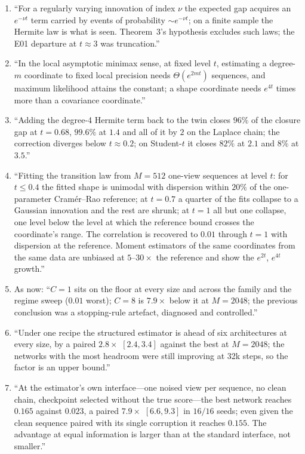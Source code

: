 \begin{enumerate}
\item {} ``For a regularly varying innovation of index $\nu$ the expected gap acquires an $e^{-\nu t}$ term carried by events of probability $\sim e^{-\nu t}$; on a finite sample the Hermite law is what is seen. Theorem~3's hypothesis excludes such laws; the E01 departure at $t\approx3$ was truncation.''
\item {} ``In the local asymptotic minimax sense, at fixed level $t$, estimating a degree-$m$ coordinate to fixed local precision needs $\Theta(e^{2mt})$ sequences, and maximum likelihood attains the constant; a shape coordinate needs $e^{4t}$ times more than a covariance coordinate.''
\item {} ``Adding the degree-4 Hermite term back to the twin closes $96\%$ of the closure gap at $t=0.68$, $99.6\%$ at $1.4$ and all of it by $2$ on the Laplace chain; the correction diverges below $t\approx0.2$; on Student-$t$ it closes $82\%$ at $2.1$ and $8\%$ at $3.5$.''
\item {} ``Fitting the transition law from $M=512$ one-view sequences at level $t$: for $t\le0.4$ the fitted shape is unimodal with dispersion within $20\%$ of the one-parameter Cram\'er--Rao reference; at $t=0.7$ a quarter of the fits collapse to a Gaussian innovation and the rest are shrunk; at $t=1$ all but one collapse, one level below the level at which the reference bound crosses the coordinate's range. The correlation is recovered to $0.01$ through $t=1$ with dispersion at the reference. Moment estimators of the same coordinates from the same data are unbiased at $5$--$30\times$ the reference and show the $e^{2t}$, $e^{4t}$ growth.''
\item {} As now: ``$C=1$ sits on the floor at every size and across the family and the regime sweep ($0.01$ worst); $C=8$ is $7.9\times$ below it at $M=2048$; the previous conclusion was a stopping-rule artefact, diagnosed and controlled.''
\item {} ``Under one recipe the structured estimator is ahead of six architectures at every size, by a paired $2.8\times$ $[2.4,3.4]$ against the best at $M=2048$; the networks with the most headroom were still improving at 32k steps, so the factor is an upper bound.''
\item {} ``At the estimator's own interface---one noised view per sequence, no clean chain, checkpoint selected without the true score---the best network reaches $0.165$ against $0.023$, a paired $7.9\times$ $[6.6,9.3]$ in $16/16$ seeds; even given the clean sequence paired with its single corruption it reaches $0.155$. The advantage at equal information is larger than at the standard interface, not smaller.''

\end{enumerate}
